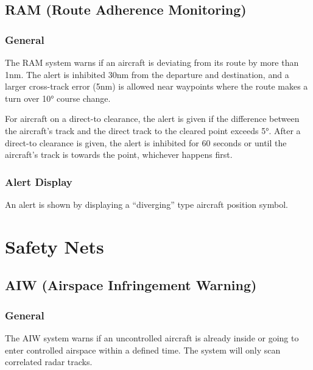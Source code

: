 \documentclass[a4paper,oneside,11pt]{memoir}
\begin{document}
\subsection{RAM (Route Adherence Monitoring)}
\label{tool:RAM}
\subsubsection*{General}

The RAM system warns if an aircraft is deviating from its route by more than 1nm. The alert is inhibited 30nm from the departure and destination, and a larger cross-track error (5nm) is allowed near waypoints where the route makes a turn over 10° course change.

\bigskip

For aircraft on a direct-to clearance, the alert is given if the difference between the aircraft’s track and the direct track to the cleared point exceeds 5°. After a direct-to clearance is given, the alert is inhibited for 60 seconds or until the aircraft’s track is towards the point, whichever happens first.

\subsubsection*{Alert Display}

An alert is shown by displaying a “diverging” type aircraft position symbol.

\section{Safety Nets}



\subsection{AIW (Airspace Infringement Warning)}
\label{tool:AIW}
\subsubsection*{General}

The AIW system warns if an uncontrolled aircraft is already inside or going to enter controlled airspace within a defined time. The system will only scan correlated radar tracks.
\end{document}
